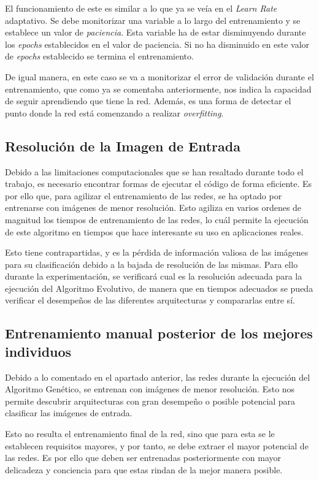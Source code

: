 El funcionamiento de este es similar a lo que ya se veía en el \textit{Learn Rate} adaptativo. Se debe monitorizar una variable a lo largo del entrenamiento y se establece un valor de \textit{paciencia}. Esta variable ha de estar disminuyendo durante los \textit{epochs} establecidos en el valor de paciencia. Si no ha disminuido en este valor de \textit{epochs} establecido se termina el entrenamiento.

De igual manera, en este caso se va a monitorizar el error de validación durante el entrenamiento, que como ya se comentaba anteriormente, nos indica la capacidad de seguir aprendiendo que tiene la red. Además, es una forma de detectar el punto donde la red está comenzando a realizar \textit{overfitting}.

\subsection{Resolución de la Imagen de Entrada}

Debido a las limitaciones computacionales que se han resaltado durante todo el trabajo, es necesario encontrar formas de ejecutar el código de forma eficiente. Es por ello que, para agilizar el entrenamiento de las redes, se ha optado por entrenarse con imágenes de menor resolución. Esto agiliza en varios ordenes de magnitud los tiempos de entrenamiento de las redes, lo cuál permite la ejecución de este algoritmo en tiempos que hace interesante su uso en aplicaciones reales.

Esto tiene contrapartidas, y es la pérdida de información valiosa de las imágenes para su clasificación debido a la bajada de resolución de las mismas. Para ello durante la experimentación, se verificará cual es la resolución adecuada para la ejecución del Algoritmo Evolutivo, de manera que en tiempos adecuados se pueda verificar el desempeños de las diferentes arquitecturas y compararlas entre sí. 

\subsection{Entrenamiento manual posterior de los mejores individuos}

Debido a lo comentado en el apartado anterior, las redes durante la ejecución del Algoritmo Genético, se entrenan con imágenes de menor resolución. Esto nos permite descubrir arquitecturas con gran desempeño o posible potencial para clasificar las imágenes de entrada.

Esto no resulta el entrenamiento final de la red, sino que para esta se le establecen requisitos mayores, y por tanto, se debe extraer el mayor potencial de las redes. Es por ello que deben ser entrenadas posteriormente con mayor delicadeza y conciencia para que estas rindan de la mejor manera posible.

